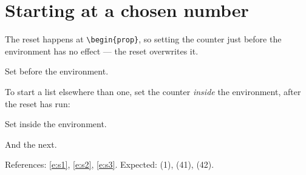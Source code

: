 \documentclass{article}
\begin{document}
\section{Starting at a chosen number}

The reset happens at \verb|\begin{prop}|, so setting the counter just before
the environment has no effect --- the reset overwrites it.

\begingroup
\setcounter{enumprop}{40}
\begin{prop}[style=enum]
  \item Set before the environment. \label{e:s1}
\end{prop}
\endgroup

To start a list elsewhere than one, set the counter \emph{inside} the
environment, after the reset has run:

\begingroup
\begin{prop}[style=enum]
  \setcounter{enumprop}{40}
  \item Set inside the environment. \label{e:s2}
  \item And the next. \label{e:s3}
\end{prop}
\endgroup

References: \ref{e:s1}, \ref{e:s2}, \ref{e:s3}.  Expected: (1), (41), (42).
\end{document}
